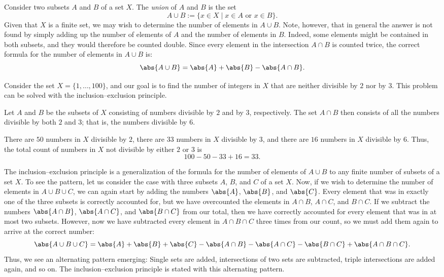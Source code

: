 Consider two subsets $A$ and $B$ of a set $X$. The \emph{union} of $A$ and $B$ is the set
\begin{equation*}
  A\cup B :=\{x\in X\mid x\in A\text{ or }x\in B\}.
\end{equation*}
Given that $X$ is a finite set, we may wish to determine the number of elements in $A\cup B$. Note, however, that in general the answer is not found by simply adding up the number of elements of $A$ and the number of elements in $B$. Indeed, some elements might be contained in both subsets, and they would therefore be counted double. Since every element in the intersection $A\cap B$ is counted twice, the correct formula for the number of elements in $A\cup B$ is:
\begin{equation*}
  \abs{A\cup B} = \abs{A} + \abs{B} - \abs{A\cap B}.
\end{equation*}

\begin{example}
  Consider the set $X=\{1,\ldots,100\}$, and our goal is to find the number of integers in $X$ that are neither divisible by $2$ nor by $3$. This problem can be solved with the inclusion--exclusion principle.

  Let $A$ and $B$ be the subsets of $X$ consisting of numbers divisible by $2$ and by $3$, respectively. The set $A\cap B$ then consists of all the numbers divisible by both $2$ and $3$; that is, the numbers divisible by $6$.

  There are $50$ numbers in $X$ divisible by $2$, there are $33$ numbers in $X$ divisible by $3$, and there are $16$ numbers in $X$ divisible by $6$. Thus, the total count of numbers in $X$ not divisible by either $2$ or $3$ is
  \begin{equation*}
    100-50-33+16=33.
  \end{equation*}
\end{example}

The inclusion--exclusion principle is a generalization of the formula for the number of elements of $A\cup B$ to any finite number of subsets of a set $X$. To see the pattern, let us consider the case with three subsets $A$, $B$, and $C$ of a set $X$. Now, if we wish to determine the number of elements in $A\cup B\cup C$, we can again start by adding the numbers $\abs{A}$, $\abs{B}$, and $\abs{C}$. Every element that was in exactly one of the three subsets is correctly accounted for, but we have overcounted the elements in $A\cap B$, $A\cap C$, and $B\cap C$. If we subtract the numbers $\abs{A\cap B}$, $\abs{A\cap C}$, and $\abs{B\cap C}$ from our total, then we have correctly accounted for every element that was in at most two subsets. However, now we have subtracted every element in $A\cap B\cap C$ three times from our count, so we must add them again to arrive at the correct number:
\begin{equation*}
  \abs{A\cup B\cup C}=\abs{A}+\abs{B}+\abs{C}-\abs{A\cap B}-\abs{A\cap C}-\abs{B\cap C}+\abs{A\cap B \cap C}.
\end{equation*}
Thus, we see an alternating pattern emerging: Single sets are added, intersections of two sets are subtracted, triple intersections are added again, and so on. The inclusion--exclusion principle is stated with this alternating pattern.

